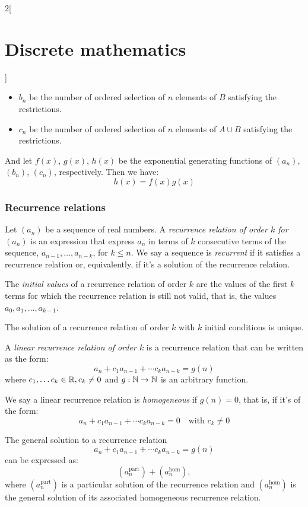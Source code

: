 \documentclass[../../../main.tex]{subfiles}
\begin{document}
\begin{multicols}{2}[\section{Discrete mathematics}]
\begin{prop}
\begin{itemize}
            \item $b_n$ be the number of ordered selection of $n$ elements of $B$ satisfying the restrictions.
            \item $c_n$ be the number of ordered selection of $n$ elements of $A\cup B$ satisfying the restrictions.
        \end{itemize}
        And let $f(x)$, $g(x)$, $h(x)$ be the exponential generating functions of $(a_n)$, $(b_n)$, $(c_n)$, respectively. Then we have: $$h(x)=f(x)g(x)$$
    \end{prop}
    \subsubsection*{Recurrence relations}
    \begin{definition}
        Let $(a_n)$ be a sequence of real numbers. A \textit{recurrence relation of order $k$ for $(a_n)$} is an expression that express $a_n$ in terms of $k$ consecutive terms of the sequence, $a_{n-1},\ldots,a_{n-k}$, for $k\leq n$. We say a sequence is \textit{recurrent} if it satisfies a recurrence relation or, equivalently, if it's a solution of the recurrence relation.
    \end{definition}
    \begin{definition}
        The \textit{initial values} of a recurrence relation of order $k$ are the values of the first $k$ terms for which the recurrence relation is still not valid, that is, the values $a_0,a_1,\ldots,a_{k-1}$.
    \end{definition}
    \begin{lemma}
        The solution of a recurrence relation of order $k$ with $k$ initial conditions is unique.
    \end{lemma}
    \begin{definition}
        A \textit{linear recurrence relation of order $k$} is a recurrence relation that can be written as the form: $$a_n+c_1a_{n-1}+\cdots c_ka_{n-k}=g(n)$$ where $c_1,\ldots c_k\in\mathbb{R} , c_k\ne 0$ and $g:\mathbb{N} \rightarrow\mathbb{N} $ is an arbitrary function.
    \end{definition}
    \begin{definition}
        We say a linear recurrence relation is \textit{homogeneous} if $g(n)=0$, that is, if it's of the form: $$a_n+c_1a_{n-1}+\cdots c_ka_{n-k}=0\quad\text{with }c_k\ne 0$$
    \end{definition}
    \begin{prop}
        The general solution to a recurrence relation $$a_n+c_1a_{n-1}+\cdots c_ka_{n-k}=g(n)$$ can be expressed as: $$(a_n^\text{part})+(a_n^\text{hom}),$$ where $(a_n^\text{part})$ is a particular solution of the recurrence relation and $(a_n^\text{hom})$ is the general solution of its associated homogeneous recurrence relation.

\end{prop}
\end{multicols}
\end{document}
